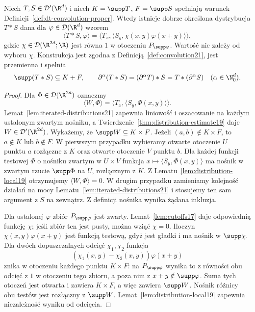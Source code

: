 \begin{twierdzenie}
\label{thm:dt-convolution-proper}
Niech $T,S\in\mathcal D'(\R^d)$ i niech
$K=\supp T$, $F=\supp S$ spełniają warunek
Definicji~\ref{def:dt-convolution-proper}.
Wtedy istnieje dobrze określona dystrybucja
$T*S$ dana dla $\varphi\in\mathcal D(\R^d)$ wzorem
\[
 \langle T*S,\varphi\rangle
 =\langle T_x,\langle S_y,\chi(x,y)\varphi(x+y)\rangle\rangle,
\]
gdzie $\chi\in\mathcal D(\R^{2d};\R)$ jest równa $1$
w otoczeniu $P_{\supp\varphi}$.
Wartość nie zależy od wyboru $\chi$.
Konstrukcja jest zgodna z Definicją~\ref{def:convolution21},
jest przemienna i spełnia
\[
 \supp(T*S)\subseteq K+F,\qquad
 \partial^\alpha(T*S)=(\partial^\alpha T)*S
 =T*(\partial^\alpha S)
 \quad(\alpha\in\N_0^d).
\]
\end{twierdzenie}
\begin{proof}
Dla $\Phi\in\mathcal D(\R^{2d})$ oznaczmy
\[
 \langle W,\Phi\rangle
 =\langle T_x,\langle S_y,\Phi(x,y)\rangle\rangle.
\]
Lemat~\ref{lem:iterated-distributions21} zapewnia
liniowość i oszacowanie na każdym ustalonym zwartym
nośniku, a Twierdzenie~\ref{thm:distribution-estimate19}
daje $W\in\mathcal D'(\R^{2d})$.
Wykażemy, że $\supp W\subseteq K\times F$.
Jeżeli $(a,b)\notin K\times F$, to $a\notin K$ lub
$b\notin F$. W pierwszym przypadku wybieramy otwarte
otoczenie $U$ punktu $a$ rozłączne z $K$ oraz otwarte
otoczenie $V$ punktu $b$. Dla każdej funkcji testowej
$\Phi$ o nośniku zwartym w $U\times V$ funkcja
$x\mapsto\langle S_y,\Phi(x,y)\rangle$ ma nośnik
w zwartym rzucie $\supp\Phi$ na $U$, rozłącznym z $K$.
Z Lematu~\ref{lem:distribution-local19} otrzymujemy
$\langle W,\Phi\rangle=0$. W drugim przypadku
zamieniamy kolejność działań na mocy
Lematu~\ref{lem:iterated-distributions21} i stosujemy
ten sam argument z $S$ na zewnątrz.
Z definicji nośnika wynika żądana inkluzja.

Dla ustalonej $\varphi$ zbiór $P_{\supp\varphi}$
jest zwarty. Lemat~\ref{lem:cutoffs17} daje odpowiednią
funkcję $\chi$; jeśli zbiór ten jest pusty, można wziąć
$\chi=0$. Iloczyn $\chi(x,y)\varphi(x+y)$ jest funkcją
testową, gdyż jest gładki i ma nośnik w $\supp\chi$.
Dla dwóch dopuszczalnych odcięć $\chi_1,\chi_2$
funkcja
\[
 (\chi_1(x,y)-\chi_2(x,y))\varphi(x+y)
\]
znika w otoczeniu każdego punktu $K\times F$:
na $P_{\supp\varphi}$ wynika to z równości obu odcięć
z $1$ w otoczeniu tego zbioru, a poza nim
z $x+y\notin\supp\varphi$.
Suma tych otoczeń jest otwarta i zawiera $K\times F$,
a więc zawiera $\supp W$. Nośnik różnicy obu testów
jest rozłączny z $\supp W$. Lemat~\ref{lem:distribution-local19}
zapewnia niezależność wyniku od odcięcia.


\end{proof}
